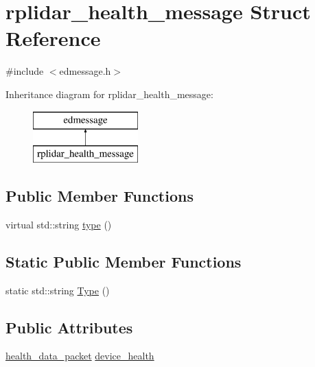 \hypertarget{structrplidar__health__message}{\section{rplidar\-\_\-health\-\_\-message Struct Reference}
\label{structrplidar__health__message}
}


{\ttfamily \#include $<$edmessage.\-h$>$}

Inheritance diagram for rplidar\-\_\-health\-\_\-message\-:\begin{figure}[H]
\begin{center}
\leavevmode
\includegraphics[height=2.000000cm]{structrplidar__health__message}
\end{center}
\end{figure}
\subsection*{Public Member Functions}
\begin{DoxyCompactItemize}
\item 
virtual std\-::string \hyperlink{structrplidar__health__message_aa886bee47423f541669914e883b838ee}{type} ()
\end{DoxyCompactItemize}
\subsection*{Static Public Member Functions}
\begin{DoxyCompactItemize}
\item 
static std\-::string \hyperlink{structrplidar__health__message_ac69cee0b7a99e25d03b67ad7eecd8b49}{Type} ()
\end{DoxyCompactItemize}
\subsection*{Public Attributes}
\begin{DoxyCompactItemize}
\item 
\hyperlink{structhealth__data__packet}{health\-\_\-data\-\_\-packet} \hyperlink{structrplidar__health__message_a5e2fa670530fc053c45278d04c681bd2}{device\-\_\-health}
\end{DoxyCompactItemize}


